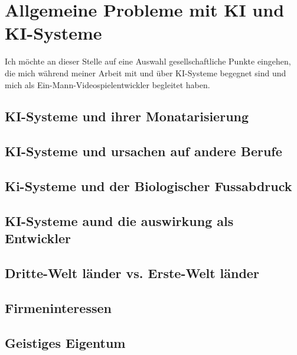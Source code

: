 \chapter{Allgemeine Probleme mit KI und KI-Systeme}

Ich möchte an dieser Stelle auf eine Auswahl gesellschaftliche Punkte eingehen, die mich während meiner Arbeit mit und über KI-Systeme begegnet sind und mich als Ein-Mann-Videospielentwickler begleitet haben.


\section{KI-Systeme und ihrer Monatarisierung}

\section{KI-Systeme und ursachen auf andere Berufe
}%

\section{Ki-Systeme und der Biologischer Fussabdruck}

\section{KI-Systeme aund die auswirkung als Entwickler}

\section{Dritte-Welt länder vs. Erste-Welt länder}

\section{Firmeninteressen}

\section{Geistiges Eigentum}
